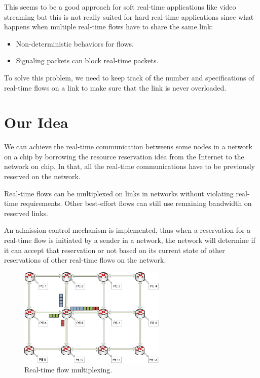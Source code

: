 \documentclass[10pt]{article}
\begin{document}
This seems to be a good approach for soft real-time applications like video streaming
but this is not really suited for hard real-time applications since what happens 
when multiple real-time flows have to share the same link:
\begin{itemize}
\item Non-deterministic behaviors for flows.
\item Signaling packets can block real-time packets.
\end{itemize}
To solve this problem, we need to keep track of the number and specifications of
real-time flows on a link to make sure that the link is never overloaded.

\section{Our Idea}
We can achieve the real-time communication betweens some nodes in a network 
on a chip by borrowing the resource reservation idea \cite{Zhang93rsvp} from the 
Internet to the network on chip. In that, all the real-time communications 
have to be previously reserved on the network. 

Real-time flows can be multiplexed \cite{Ferrari90ascheme, Zhang_1service} on links in networks without violating
real-time requirements. Other best-effort flows can still use remaining bandwidth on reserved links.

An admission control mechanism is implemented, thus when a reservation 
for a real-time flow is initiated by a sender in a network, the network will determine if 
it can accept that reservation or not based on its current state of other 
reservations of other real-time flows on the network.

\begin{figure}[htp]\label{fig:FlowMultiplex}
\centering
\includegraphics[width=7cm]{pics/Multiplex2}
\caption[Real time flow multiplexing.]
{Real-time flow multiplexing.}
\end{figure}
\end{document}
